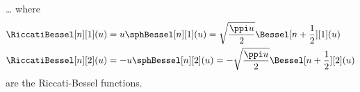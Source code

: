 \par
\dots
where
\begin{equation}
    \begin{split}
        \RiccatiBessel[n][1](u) &= u \sphBessel[n][1](u) = \sqrt{\frac{\ppi u}{2}} \Bessel[n+ \frac{1}{2}][1](u)  \\
        \RiccatiBessel[n][2](u) &=- u \sphBessel[n][2](u) = -\sqrt{\frac{\ppi u}{2}} \Bessel[n+ \frac{1}{2}][2](u)  
    \end{split}
\end{equation}
are the Riccati-Bessel functions.